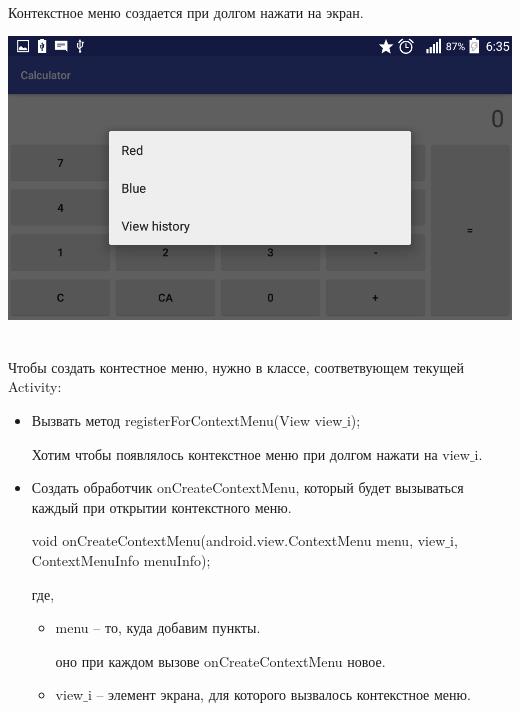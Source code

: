 
\\

    Контекстное меню создается при долгом нажати на экран.

    \includegraphics[scale=0.3]{06-context-menus/Screenshot.png}
    
\\

    Чтобы создать контестное меню, нужно в классе, соответвующем текущей Activity: 
    
    \begin{itemize}
        \item Вызвать метод registerForContextMenu(View view$\_$i);
    
        Хотим чтобы появлялось контекстное меню при долгом нажати на view$\_$i.
    
        \item Создать обработчик onCreateContextMenu, который будет вызываться каждый при открытии контекстного меню.
    
        void onCreateContextMenu(android.view.ContextMenu menu, view$\_$i, ContextMenuInfo menuInfo);
        
        где, 
        \begin{itemize}
            \item menu -- то, куда добавим пункты.
            
            оно при каждом вызове onCreateContextMenu новое. 
    
            \item view$\_$i -- элемент экрана, для которого вызвалось контекстное меню.
        \end{itemize}
    \end{itemize}

